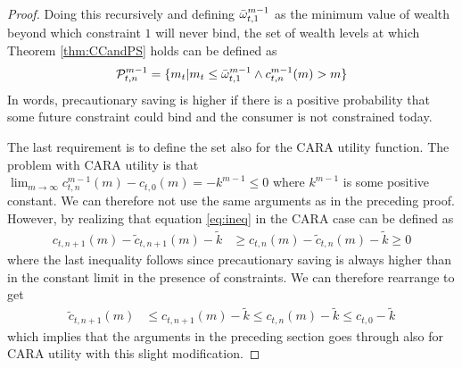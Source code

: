 \documentclass[titlepage,letterpaper]{\econtex}
\newcommand{\ifVerbatimWrite}{\ifthenelse{\boolean{verbatimwriteOn}}} %
\renewenvironment{verbatimwrite}[1]{} %
\providecommand{\wAlt}{\omega}
\begin{document}
\begin{verbatimwrite}{./Sections/Proofs}
\begin{proof}
    
    Doing this recursively and defining $\bar{\wAlt}_{t,1}^{m-1}$ as the minimum value of wealth beyond which constraint $1$ will never bind, the set of wealth levels at which Theorem \ref{thm:CCandPS} holds can be defined as
    \[\mathcal{P}_{t,n}^{m-1} = \{{m}_{t} | {m}_{t} \leq \bar{\wAlt}_{t,1}^{m-1} \wedge c_{t,n}^{m-1}({m}) > {m} \}\]
    In words, precautionary saving is higher if there is a positive probability that some future constraint could bind and the consumer is not constrained today. 
    
    The last requirement is to define the set also for the CARA utility function. The problem with CARA utility is that $\lim_{{m}\rightarrow \infty} c_{t,n}^{m-1}({m}) - c_{t,0}({m}) = - k^{m-1} \leq 0$ where $k^{m-1}$ is some positive constant. We can therefore not use the same arguments as in the preceding proof. However, by realizing that equation \eqref{eq:ineq} in the CARA case can be defined as
    \begin{align*}
      c_{t,n+1}({m}) - \tilde{c}_{t,n+1}({m}) - \tilde{k} &\geq c_{t,n}({m})-\tilde{c}_{t,n}({m}) -  \tilde{k} \geq 0 
    \end{align*}
    where the last inequality follows since precautionary saving is always higher than in the constant limit in the presence of constraints. We can therefore rearrange to get
    \begin{align*}
      \tilde{c}_{t,n+1}({m})  &\leq c_{t,n+1}({m}) - \tilde{k} \leq c_{t,n}({m}) - \tilde{k} \leq c_{t,0} - \tilde{k}	\end{align*}
    which implies that the arguments in the preceding section goes through also for CARA utility with this slight modification. 
    
  \end{proof}

\end{verbatimwrite}\ifVerbatimWrite{}{} %

\clearpage\pagebreak\vfill\eject


\end{document}
